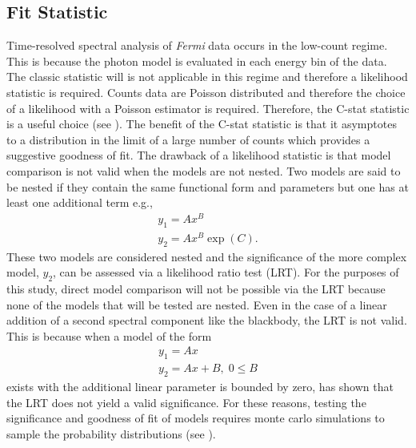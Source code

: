 \subsection{Fit Statistic}
Time-resolved spectral analysis of {\it Fermi} data occurs in the
low-count regime. This is because the photon model is evaluated in
each energy bin of the data. The classic \chisq statistic will is not
applicable in this regime and therefore a likelihood statistic is
required. Counts data are Poisson distributed and therefore the choice
of a likelihood with a Poisson estimator is required. Therefore, the
C-stat statistic is a useful choice (see \cite{Arnaud:2011}). The
benefit of the C-stat statistic is that it asymptotes to a \chisq
distribution in the limit of a large number of counts which provides a
suggestive goodness of fit. The drawback of a likelihood statistic is
that model comparison is not valid when the models are not nested. Two
models are said to be nested if they contain the same functional form
and parameters but one has at least one additional term e.g.,
\begin{equation}
\begin{array}{l}
\displaystyle y_1=Ax^{B} \\
\displaystyle y_2=Ax^{B}\exp(C).
\end{array}
\label{eq:nest}
\end{equation}
These two models are considered nested and the significance of the
more complex model, $y_2$, can be assessed via a likelihood ratio test
(LRT). For the purposes of this study, direct model comparison will
not be possible via the LRT because none of the models that will be
tested are nested. Even in the case of a linear addition of a second
spectral component like the blackbody, the LRT is not valid. This is
because when a model of the form
\begin{equation}
\begin{array}{l}
\displaystyle y_1=Ax \\
\displaystyle y_2=Ax+B,\;0\le B
\end{array}
\label{eq:nestlin}
\end{equation}
exists with the additional linear parameter is bounded by zero,
\cite{Protassov:2002} has shown that the LRT does not yield a valid
significance. For these reasons, testing the significance and goodness
of fit of models requires monte carlo simulations to sample the
probability distributions (see ).

